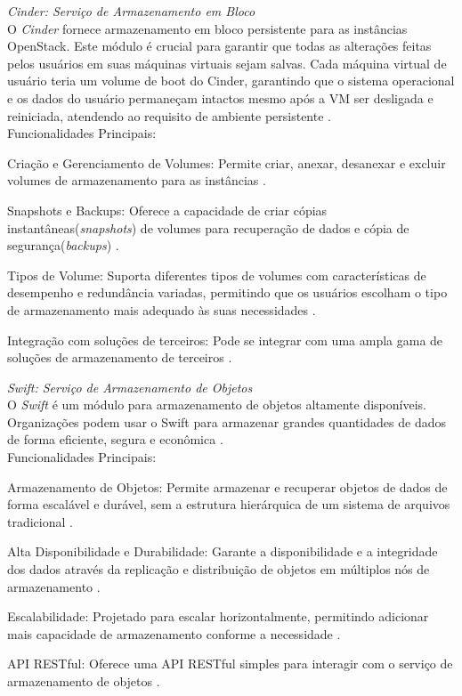 \begin{description}
    \item \emph{Cinder: Serviço de Armazenamento em Bloco}\\
    O  \textit{Cinder} fornece armazenamento em bloco persistente para as instâncias OpenStack. Este módulo é crucial para garantir que todas as alterações feitas pelos usuários em suas máquinas virtuais sejam salvas. Cada máquina virtual de usuário teria um volume de boot do Cinder, garantindo que o sistema operacional e os dados do usuário permaneçam intactos mesmo após a VM ser desligada e reiniciada, atendendo ao requisito de ambiente persistente \cite{openstackcinder}.\\
    Funcionalidades Principais:
    \begin{description}
        \item Criação e Gerenciamento de Volumes: Permite criar, anexar, desanexar e excluir volumes de armazenamento para as instâncias \cite{openstackcinder}.
        \item Snapshots e Backups: Oferece a capacidade de criar cópias instantâneas(\textit{snapshots}) de volumes para recuperação de dados e cópia de segurança(\textit{backups}) \cite{openstackcinder}.
        \item Tipos de Volume: Suporta diferentes tipos de volumes com características de desempenho e redundância variadas, permitindo que os usuários escolham o tipo de armazenamento mais adequado às suas necessidades \cite{openstackcinder}.
        \item Integração com  soluções de terceiros: Pode se integrar com uma ampla gama de soluções de armazenamento de terceiros \cite{openstackcinder}.
    \end{description}

    \item \emph{Swift: Serviço de Armazenamento de Objetos}\\
    O  \textit{Swift} é um módulo para armazenamento de objetos altamente disponíveis. Organizações podem usar o Swift para armazenar grandes quantidades de dados de forma eficiente, segura e econômica \cite{openstackswift}.\\
    Funcionalidades Principais:
    \begin{description}
        \item Armazenamento de Objetos: Permite armazenar e recuperar objetos de dados de forma escalável e durável, sem a estrutura hierárquica de um sistema de arquivos tradicional \cite{openstackswift}.
        \item Alta Disponibilidade e Durabilidade: Garante a disponibilidade e a integridade dos dados através da replicação e distribuição de objetos em múltiplos nós de armazenamento  \cite{openstackswift}.
        \item Escalabilidade: Projetado para escalar horizontalmente, permitindo adicionar mais capacidade de armazenamento conforme a necessidade  \cite{openstackswift}.
        \item API RESTful: Oferece uma API RESTful simples para interagir com o serviço de armazenamento de objetos  \cite{openstackswift}.
    \end{description}
\end{description}

